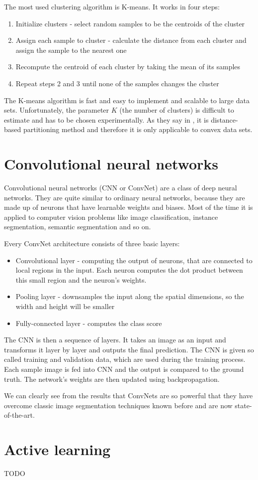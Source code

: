 The most used clustering algorithm is K-means. It works in four steps:

\begin{enumerate}
	\item Initialize clusters - select random samples to be the centroids of the cluster
	\item Assign each sample to cluster - calculate the distance from each cluster and
	assign the sample to the nearest one
	\item Recompute the centroid of each cluster by taking the mean of its samples
	\item Repeat steps 2 and 3 until none of the samples changes the cluster
\end{enumerate}

The K-means algorithm is fast and easy to implement and scalable to large
data sets. Unfortunately, the parameter $K$ (the number of clusters)
is difficult to estimate and has to be chosen experimentally.
As they say in \cite{bib:yuheng2017image}, it is distance-based partitioning method and
therefore it is only applicable to convex data sets.

\section{Convolutional neural networks}
\label{sec:cnn}

Convolutional neural networks (CNN or ConvNet) are a class of deep neural networks.
They are quite similar to ordinary neural networks, because they are made up of
neurons that have learnable weights and biases.
Most of the time it
is applied to computer vision problems like image classification, instance segmentation,
semantic segmentation and so on.

Every ConvNet architecture consists of three basic layers:
\begin{itemize}
	\item Convolutional layer - computing the output of neurons, that are
	connected to local regions in the input. Each neuron computes the dot product
	between this small region and the neuron's weights.
	\item Pooling layer - downsamples the input along the spatial dimensions, so the
	width and height will be smaller
	\item Fully-connected layer - computes the class score 
\end{itemize}

The CNN is then a sequence of layers. It takes an image as an input and transforms
it layer by layer and outputs the final prediction. The CNN is given so called training
and validation data, which are used during the training process. Each sample image
is fed into CNN and the output is compared to the ground truth. The network's weights
are then updated using backpropagation.

We can clearly see from the results that ConvNets are so powerful that they have
overcome classic image segmentation techniques known before and are now
state-of-the-art. 

\section{Active learning}
\label{sec:active_learning}

TODO
